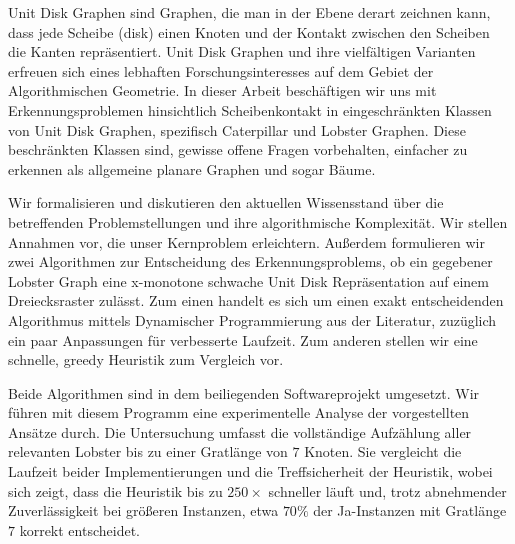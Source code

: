 \documentclass[draft,final]{vutinfth} %
\begin{document}
\begin{kurzfassung}
Unit Disk Graphen sind Graphen, die man in der Ebene derart zeichnen kann, dass jede Scheibe (disk) einen Knoten und der Kontakt zwischen den Scheiben die Kanten repräsentiert. Unit Disk Graphen und ihre vielfältigen Varianten erfreuen sich eines lebhaften Forschungsinteresses auf dem Gebiet der Algorithmischen Geometrie. In dieser Arbeit beschäftigen wir uns mit Erkennungsproblemen hinsichtlich Scheibenkontakt in eingeschränkten Klassen von Unit Disk Graphen, spezifisch Caterpillar und Lobster Graphen. Diese beschränkten Klassen sind, gewisse offene Fragen vorbehalten, einfacher zu erkennen als allgemeine planare Graphen und sogar Bäume.

Wir formalisieren und diskutieren den aktuellen Wissensstand über die betreffenden Problemstellungen und ihre algorithmische Komplexität. Wir stellen Annahmen vor, die unser Kernproblem erleichtern. Außerdem formulieren wir zwei Algorithmen zur Entscheidung des Erkennungsproblems, ob ein gegebener Lobster Graph eine x-monotone schwache Unit Disk Repräsentation auf einem Dreiecksraster zulässt. Zum einen handelt es sich um einen exakt entscheidenden Algorithmus mittels Dynamischer Programmierung aus der Literatur, zuzüglich ein paar Anpassungen für verbesserte Laufzeit. Zum anderen stellen wir eine schnelle, greedy Heuristik zum Vergleich vor.

Beide Algorithmen sind in dem beiliegenden Softwareprojekt umgesetzt. Wir führen mit diesem Programm eine experimentelle Analyse der vorgestellten Ansätze durch. Die Untersuchung umfasst die vollständige Aufzählung aller relevanten Lobster bis zu einer Gratlänge von $7$ Knoten. Sie vergleicht die Laufzeit beider Implementierungen und die Treffsicherheit der Heuristik, wobei sich zeigt, dass die Heuristik bis zu $250\times$ schneller läuft und, trotz abnehmender Zuverlässigkeit bei größeren Instanzen, etwa $70\%$ der Ja-Instanzen mit Gratlänge $7$ korrekt entscheidet.
\end{kurzfassung}
\end{document}
